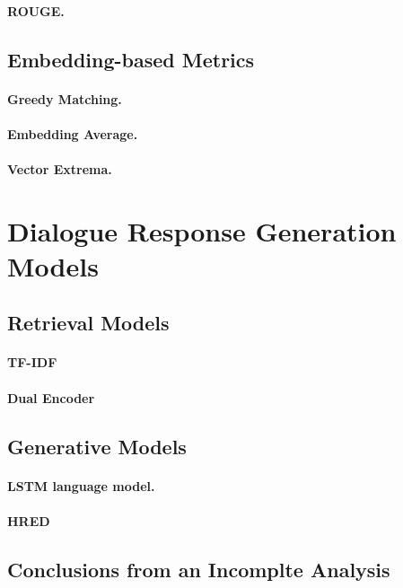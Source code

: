 \documentclass[runningheads]{llncs}
\begin{document}
\paragraph{ROUGE.}

\subsection{Embedding-based Metrics}
\paragraph{Greedy Matching.}
\paragraph{Embedding Average.}
\paragraph{Vector Extrema.}


\section{Dialogue Response Generation Models}
\subsection{Retrieval Models}
\paragraph{TF-IDF}
\paragraph{Dual Encoder}

\subsection{Generative Models}
\paragraph{LSTM language model.}
\paragraph{HRED}
\subsection{Conclusions from an Incomplte Analysis}
\end{document}
